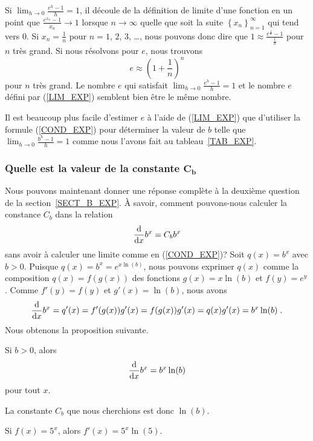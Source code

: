 {\begin{rmk}
Si $\displaystyle \lim_{h\rightarrow 0} \frac{e^h-1}{h} = 1$, il
découle de la définition de limite d'une fonction en un point que
$\displaystyle \frac{e^{x_n}-1}{x_n} \rightarrow 1$ lorsque
$n \rightarrow \infty$ quelle que soit la suite
$\displaystyle \left\{x_n\right\}_{n=1}^\infty$ qui tend vers $0$.  Si
$x_n = \frac{1}{n}$ pour $n=1$, $2$, $3$, \ldots, nous pouvons donc dire que
$\displaystyle 1 \approx \frac{e^{\frac{1}{n}}-1}{\frac{1}{n}}$
pour $n$ très grand.  Si nous résolvons pour $e$, nous trouvons
\[
e \approx \left(1 + \frac{1}{n}\right)^n
\]
pour $n$ très grand.  Le nombre $e$ qui satisfait
$\displaystyle \lim_{h\rightarrow 0} \frac{e^h-1}{h} = 1$ et le nombre
$e$ défini par (\ref{LIM_EXP}) semblent bien être le même nombre.

Il est beaucoup plus facile d'estimer $e$ à l'aide de (\ref{LIM_EXP})
que d'utiliser la formule (\ref{COND_EXP}) pour déterminer la valeur
de $b$ telle que $\displaystyle \lim_{h\rightarrow 0} \frac{b^h-1}{h} = 1$
comme nous l'avons fait au tableau~\ref{TAB_EXP}.
\end{rmk}

\subsubsection{Quelle est la valeur de la constante $\mathbf{C_b}$}

Nous pouvons maintenant donner une réponse complète à la deuxième question
de la section~\ref{SECT_B_EXP}.  À savoir, comment pouvons-nous calculer la
constance $C_b$ dans la relation
\[
\dfdx{b^x}{x} = C_b b^x
\]
sans avoir à calculer une limite comme en (\ref{COND_EXP})?  Soit
$q(x) = b^x$ avec $b>0$.  Puisque
$\displaystyle q(x) = b^x = e^{x\ln(b)}$, 
nous pouvons exprimer $q(x)$ comme la composition $q(x) = f(g(x))$ des
fonctions $g(x) = x \ln(b)$ et $f(y) = e^y$. Comme
$f'(y) = f(y)$ et $g'(x) = \ln(b)$, nous avons
\[
\dfdx{b^x}{x} = q'(x) = f'(g(x)) g'(x) = f(g(x)) g'(x)
= q(x) g'(x) = b^x \ln(b) \;.
\]
Nous obtenons la proposition suivante.

\begin{focus}{\prp}\label{BexpX}
Si $b>0$, alors
\[
\dfdx{b^x}{x} = b^x \ln(b)
\]
pour tout $x$.
\end{focus}

La constante $C_b$ que nous cherchions est donc $\ln(b)$.

\begin{egg}
Si $f(x) = 5^x$, alors $f'(x) = 5^x \ln(5)$.
\end{egg}

}
